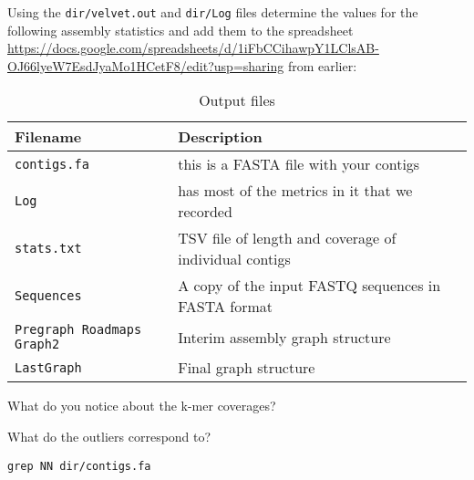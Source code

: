 Using the \texttt{dir/velvet.out} and \texttt{dir/Log} files determine the values for the following assembly statistics and add them to the spreadsheet \url{https://docs.google.com/spreadsheets/d/1iFbCCihawpY1LClsAB-OJ66lyeW7EsdJyaMo1HCetF8/edit?usp=sharing} from earlier:
\begin{table}[H]
  \centering
  \caption{Output files}
    \begin{tabular}{ll}
    \toprule
    \textbf{Filename} & \textbf{Description} \\
    \midrule
    \texttt{contigs.fa} & this is a FASTA file with your contigs \\
    \texttt{Log} & has most of the metrics in it that we recorded \\
	\texttt{stats.txt} & TSV file of length and coverage of individual contigs \\ 
	\texttt{Sequences} & A copy of the input FASTQ sequences in FASTA format \\ 
	\texttt{Pregraph Roadmaps Graph2} & Interim assembly graph structure \\ 
	\texttt{LastGraph} & Final graph structure \\
    \bottomrule
    \end{tabular}
  \label{tab:velvet_out}
\end{table}


\begin{questions}
What do you notice about the k-mer coverages?
\begin{answer}
\end{answer}
What do the outliers correspond to?
\begin{answer}
\end{answer}
\end{questions}

\begin{steps}
\begin{lstlisting}
grep NN dir/contigs.fa
\end{lstlisting}
\end{steps}


